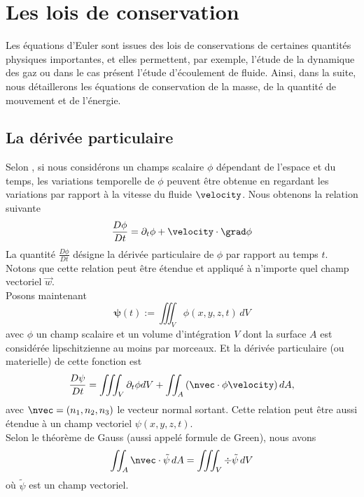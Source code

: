 

%

\section{Les lois de conservation}
Les équations d'Euler sont issues des lois de conservations de certaines quantités physiques importantes, et elles permettent, par exemple, l'étude de la dynamique des gaz ou dans le cas présent l'étude d'écoulement de fluide. Ainsi, dans la suite, nous détaillerons les équations de conservation de la masse, de la quantité de mouvement et de l'énergie.\\
\subsection{La dérivée particulaire}
Selon \citep{toro_riemann_2009}, si nous considérons un champs scalaire $\phi$ dépendant de l'espace et du temps, les variations temporelle de $\phi$ peuvent être obtenue en regardant les variations par rapport à la vitesse du fluide $\velocity$. Nous obtenons la relation suivante
\begin{equation}
	\frac{D\phi}{Dt} = \partial_t \phi + \velocity \cdot \grad \phi \label{eq:deriveetotale}
\end{equation}
La quantité $\frac{D \phi}{D t}$ désigne la dérivée particulaire de $\phi$ par rapport au temps $t$. Notons que cette relation peut être étendue et appliqué à n'importe quel champ vectoriel $\vec{w}$.\\
Posons maintenant 
\begin{equation}
	\boldsymbol{\psi} (t) := \iiint_V \phi (x, y, z, t)\,d V \label{eq:volumeintegration}
\end{equation}
avec $\phi$ un champ scalaire et un volume d'intégration $V$ dont la surface $A$ est considérée lipschitzienne au moins par morceaux. Et la dérivée particulaire (ou materielle) de cette fonction est 
\begin{equation}
	\frac{D \psi}{D t} = \iiint_V \partial_t \phi d V + \iint_A \left(\nvec\cdot\phi\velocity\right)d A, \label{eq:psiinte}
\end{equation}
avec $\nvec = (n_1, n_2, n_3)$ le vecteur normal sortant. Cette relation peut être aussi étendue à un champ vectoriel $\psi (x, y, z, t)$.\\
Selon le théorème de Gauss (aussi appelé formule de Green), nous avons
\begin{equation}
	\iint_A \nvec \cdot \tilde{\psi}\,d A = \iiint_V \div \tilde{\psi} \,d V \label{eq:greenfrm}
\end{equation}
où $\tilde{\psi}$ est un champ vectoriel.


